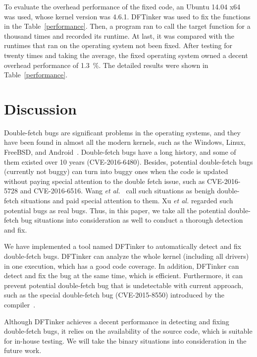 \documentclass[10pt]{llncs}
\begin{document}
To evaluate the overhead performance of the fixed code, an Ubuntu 14.04 x64 was used, whose kernel version was 4.6.1. DFTinker was used to fix the functions in the Table~\ref{performance}. Then, a program ran to call the target function for a thousand times and recorded its runtime. At last, it was compared with the runtimes that ran on the operating system not been fixed. After testing for twenty times and taking the average, the fixed operating system owned a decent overhead performance of 1.3~\%. The detailed results were shown in Table~\ref{performance}.

\section{Discussion}%
\label{discuss}

Double-fetch bugs are significant problems in the operating systems, and they have been found in almost all the modern kernels, such as the Windows, Linux, FreeBSD, and Android~\cite{wang,precise}. Double-fetch bugs have a long history, and some of them existed over 10 years (CVE-2016-6480). Besides, potential double-fetch bugs (currently not buggy) can turn into buggy ones when the code is updated without paying special attention to the double fetch issue, such as CVE-2016-5728 and CVE-2016-6516. Wang \textit{et al.}~\cite{wang} call such situations as benigh double-fetch situations and paid special attention to them. Xu \textit{et al.}\cite{precise} regarded such potential bugs as real bugs. Thus, in this paper, we take all the potential double-fetch bug situations into consideration as well to conduct a thorough detection and fix.

We have implemented a tool named DFTinker to automatically detect and fix double-fetch bugs. DFTinker can analyze the whole kernel (including all drivers) in one execution, which has a good code coverage. In addition, DFTinker can detect and fix the bug at the same time, which is efficient. Furthermore, it can prevent potential double-fetch bug that is undetectable with current approach, such as the special double-fetch bug (CVE-2015-8550) introduced by the compiler~\cite{wilhelm15tracing}.  

Although DFTinker achieves a decent performance in detecting and fixing double-fetch bugs, it relies on the availability of the source code, which is suitable for in-house testing. We will take the binary situations into consideration in the future work. 

\end{document}
